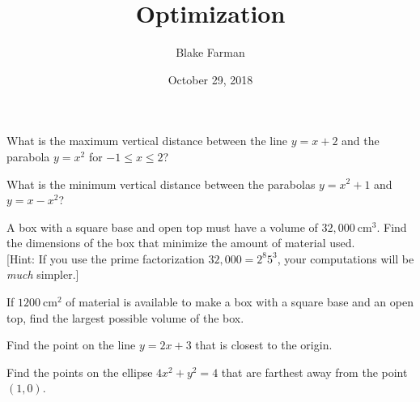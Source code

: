 \documentclass[10pt]{amsart}
\title[Optimization]{Optimization}
\date{October 29, 2018}
\author{Blake Farman}
\begin{document}
\maketitle

\makenameslot

\begin{thm}
  What is the maximum vertical distance between the line \(y = x + 2\) and the parabola \(y = x^2\) for \(-1 \leq x \leq 2\)?
\end{thm}

\vspace{3in}

\begin{thm}
  What is the minimum vertical distance between the parabolas \(y = x^2 + 1\) and \(y = x - x^2\)?
\end{thm}

\newpage

\begin{thm}
  A box with a square base and open top must have a volume of \(32,000\ \text{cm}^3\).
  Find the dimensions of the box that minimize the amount of material used.\\
  {[Hint: If you use the prime factorization \(32,000 = 2^8 5^3\), your computations will be \textit{much} simpler.]}
\end{thm}

\vspace{3in}

\begin{thm}
  If \(1200\ \text{cm}^2\) of material is available to make a box with a square base and an open top, find the largest possible volume of the box.
\end{thm}

\newpage

\begin{thm}
  Find the point on the line \(y = 2x + 3\) that is closest to the origin.
\end{thm}

\vspace{3in}

\begin{thm}
  Find the points on the ellipse \(4x^2 + y^2 = 4\) that are farthest away from the point \((1,0)\).
\end{thm}
\end{document}
